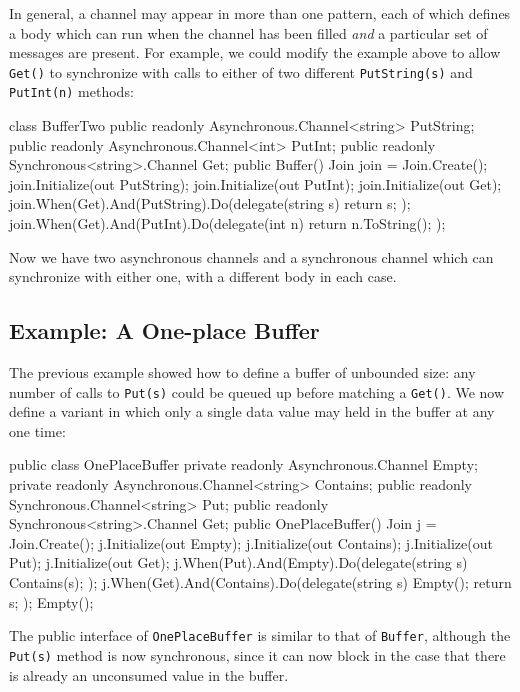 \documentclass{article}
\begin{document}
In general, a channel
may appear in more than one pattern, each of which defines a body which
can run when the channel has been filled \emph{and} a particular set of
messages are present. For example, we could modify the
example above to allow \verb|Get()| to synchronize with calls to
either of two different \verb|PutString(s)| and \verb|PutInt(n)| methods:

\begin{lstcsharp}
class BufferTwo {
  public readonly Asynchronous.Channel<string> PutString;
  public readonly Asynchronous.Channel<int> PutInt;
  public readonly Synchronous<string>.Channel Get;
  public Buffer() { 
    Join join = Join.Create();
    join.Initialize(out PutString);  
    join.Initialize(out PutInt);  
    join.Initialize(out Get);
    join.When(Get).And(PutString).Do(delegate(string s) {
       return s; 
    });
    join.When(Get).And(PutInt).Do(delegate(int n) {
       return n.ToString(); 
    });
  }
}
\end{lstcsharp}

Now we have two asynchronous channels  and a synchronous channel which
can synchronize with either one, with a different body in each case.

\subsection{Example: A One-place Buffer}\label{sect:cwoneplacebuffer}
The previous example showed how to define a buffer of unbounded size:
any number of calls to \verb|Put(s)| could be queued up before matching a
\verb|Get()|. We now define a variant in which only a single data value may
held in the buffer at any one time:
\begin{lstcsharp}
  public class OnePlaceBuffer {
    private readonly Asynchronous.Channel Empty;
    private readonly Asynchronous.Channel<string> Contains;
    public readonly Synchronous.Channel<string> Put;
    public readonly Synchronous<string>.Channel Get;
    public OnePlaceBuffer() {
      Join j = Join.Create();
      j.Initialize(out Empty);
      j.Initialize(out Contains);
      j.Initialize(out Put);
      j.Initialize(out Get);
      j.When(Put).And(Empty).Do(delegate(string s) {
        Contains(s);
      });
      j.When(Get).And(Contains).Do(delegate(string s) {
        Empty();
        return s;
      });
      Empty();
    }
  }
\end{lstcsharp}

The public interface of \verb|OnePlaceBuffer| is similar to that of \verb|Buffer|,
although the \verb|Put(s)| method is now synchronous, since it can now block
in the case that there is already an unconsumed value in the buffer.
\end{document}
